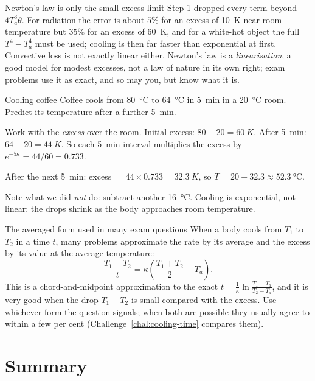 \begin{trapbox}{Newton's law is only the small-excess limit}
Step 1 dropped every term beyond $4T_a^3\theta$. For radiation the error is about $5\%$ for an excess of
\SI{10}{K} near room temperature but $35\%$ for an excess of \SI{60}{K}, and for a white-hot object the
full $T^4 - T_a^4$ must be used; cooling is then far faster than exponential at first. Convective loss
is not exactly linear either. Newton's law is a \emph{linearisation}, a good model for modest excesses,
not a law of nature in its own right; exam problems use it as exact, and so may you, but know what it
is.
\end{trapbox}

\begin{exbox}{Cooling coffee}\label{ex:coffee}
Coffee cools from \SI{80}{\celsius} to \SI{64}{\celsius} in \SI{5}{min} in a \SI{20}{\celsius}
room. Predict its temperature after a further \SI{5}{min}.

 Work with the \emph{excess} over the room. Initial excess: $80-20 = \SI{60}{K}$. After
\SI{5}{min}: $64-20 = \SI{44}{K}$. So each \SI{5}{min} interval multiplies the excess by
$e^{-5\kappa}=44/60 = 0.733$.

 After the next \SI{5}{min}: excess $= 44 \times 0.733 = \SI{32.3}{K}$, so
$T = 20 + 32.3 \approx \SI{52.3}{\celsius}$.

\medskip
Note what we did \emph{not} do: subtract another \SI{16}{\celsius}. Cooling is exponential, not
linear: the drops shrink as the body approaches room temperature. 
\end{exbox}

\begin{methodbox}{The averaged form used in many exam questions}
When a body cools from $T_1$ to $T_2$ in a time $t$, many problems approximate the rate by its
average and the excess by its value at the average temperature:
\[
\frac{T_1-T_2}{t} = \kappa\left(\frac{T_1+T_2}{2} - T_a\right).
\]
This is a chord-and-midpoint approximation to the exact $t=\frac1\kappa\ln\frac{T_1-T_a}{T_2-T_a}$, and
it is very good when the drop $T_1-T_2$ is small compared with the excess. Use whichever form the
question signals; when both are possible they usually agree to within a few per cent
(Challenge~\ref{chal:cooling-time} compares them).
\end{methodbox}

\section{Summary}\label{sec:summary-thermal}

